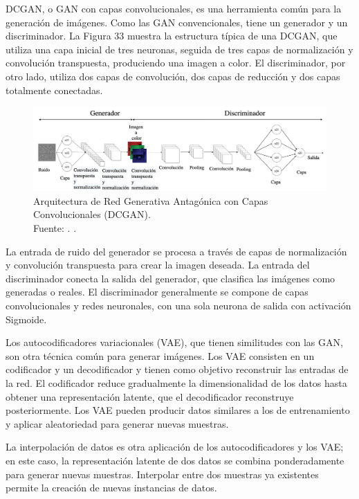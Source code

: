 DCGAN, o GAN con capas convolucionales, es una herramienta común para la generación de imágenes. Como las GAN convencionales, tiene un generador y un discriminador. La Figura 33 muestra la estructura típica de una DCGAN, que utiliza una capa inicial de tres neuronas, seguida de tres capas de normalización y convolución transpuesta, produciendo una imagen a color. El discriminador, por otro lado, utiliza dos capas de convolución, dos capas de reducción y dos capas totalmente conectadas. \parencite{tec_kingma2019variat}

\begin{figure}[!ht]
	\begin{center}
		\includegraphics[width=1\textwidth]{2/figures/genimagenes.jpg}
		\caption[Arquitectura de Red Generativa Antagónica con Capas Convolucionales (DCGAN)]{Arquitectura de Red Generativa Antagónica con Capas Convolucionales (DCGAN).\\
		Fuente: \cite{tec_kingma2019variat}. .}
		\label{2:fig50}
	\end{center}
\end{figure}

La entrada de ruido del generador se procesa a través de capas de normalización y convolución transpuesta para crear la imagen deseada. La entrada del discriminador conecta la salida del generador, que clasifica las imágenes como generadas o reales. El discriminador generalmente se compone de capas convolucionales y redes neuronales, con una sola neurona de salida con activación Sigmoide. \parencite{tec_kingma2019variat}

Los autocodificadores variacionales (VAE), que tienen similitudes con las GAN, son otra técnica común para generar imágenes. Los VAE consisten en un codificador y un decodificador y tienen como objetivo reconstruir las entradas de la red. El codificador reduce gradualmente la dimensionalidad de los datos hasta obtener una representación latente, que el decodificador reconstruye posteriormente. Los VAE pueden producir datos similares a los de entrenamiento y aplicar aleatoriedad para generar nuevas muestras. \parencite{tec_kingma2013bayes}

La interpolación de datos es otra aplicación de los autocodificadores y los VAE; en este caso, la representación latente de dos datos se combina ponderadamente para generar nuevas muestras. Interpolar entre dos muestras ya existentes permite la creación de nuevas instancias de datos. \parencite{tec_kingma2013bayes}

\newpage
